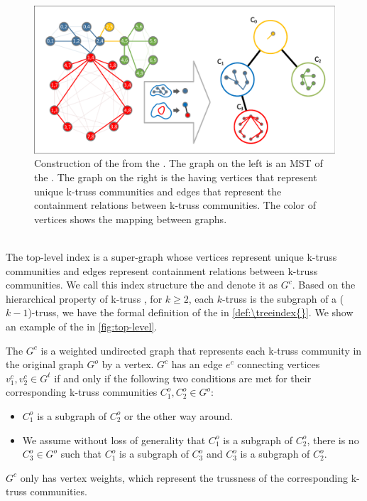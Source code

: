 \begin{figure}[h]
    \centering
    \includegraphics[width=0.8\linewidth, trim={0.6cm 0.6cm, 0.6cm, 0.6cm}, clip]{./figures/top_level.pdf}
		\vspace{-0.2cm}
    \caption{Construction of the \treeindex{} from the \inducedgraph{}. The graph on the left is an MST of the \inducedgraph{}. The graph on the right is the \treeindex{} having vertices that represent unique k-truss communities and edges that represent the containment relations between k-truss communities. The color of vertices shows the mapping between graphs.}
    \label{fig:top-level}
		\vspace{-0.1cm}
\end{figure}

~\\The top-level index is a super-graph whose vertices represent unique k-truss communities and edges represent containment relations between k-truss communities. We call this index structure the \treeindex{} and denote it as $G^c$. Based on the hierarchical property of k-truss \cite{cohen2008trusses}, \ie for $k \ge 2$, each $k$-truss is the subgraph of a ($k-1$)-truss, we have the formal definition of the \treeindex{} in \autoref{def:\treeindex{}}. We show an example of the \treeindex{} in \autoref{fig:top-level}.

\begin{Def}[\Treeindex{}]
The \treeindex{} $G^c$ is a weighted undirected graph that represents each k-truss community in the original graph $G^o$ by a vertex. $G^c$ has an edge $e^c$ connecting vertices $v^{c}_{1}, v^{c}_{2} \in G^{t}$ if and only if the following two conditions are met for their corresponding k-truss communities $C^{o}_{1}, C^{o}_{2} \in G^{o}$:
\begin{itemize}
	\item $C^{o}_{1}$ is a subgraph of $C^{o}_{2}$ or the other way around.
	\item We assume without loss of generality that $C^{o}_{1}$ is a subgraph of $C^{o}_{2}$, there is no $C^{o}_{3} \in G^{o}$ such that $C^{o}_{1}$ is a subgraph of $C^{o}_{3}$ and $C^{o}_{3}$ is a subgraph of $C^{o}_{2}$.
\end{itemize}
$G^c$ only has vertex weights, which represent the trussness of the corresponding k-truss communities.
\label{def:\treeindex{}}
\end{Def}

